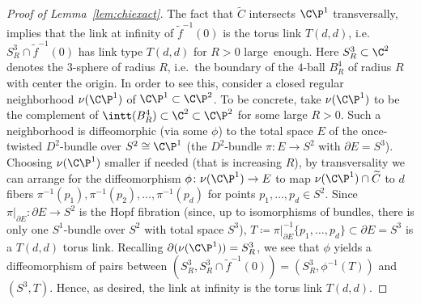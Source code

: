 \begin{proof}[Proof of Lemma~\ref{lem:chiexact}]
The fact that $\widetilde{C}$ intersects $\C\P^1$ transversally, implies that the link at infinity of $\widetilde{f}^{-1}(0)$ is the torus link $T(d,d)$, i.e.~$S^3_R\cap \widetilde{f}^{-1}(0)$ has link type $T(d,d)$ for $R>0$ large~enough. Here $S^3_R\subset \C^2$ denotes the $3$-sphere of radius $R$, i.e.~the boundary of the $4$-ball $B^4_R$ of radius $R$ with center the origin. In order to see this, consider a closed regular neighborhood $\nu(\C\P^1)$ of $\C\P^1\subset\C\P^2$. To be concrete, take $\nu(\C\P^1)$ to be the complement of $\intt(B^4_R)\subset\C^2\subset\C\P^2$ for some large $R>0$. Such a neighborhood is diffeomorphic (via some $\phi$) to the total space $E$ of the once-twisted $D^2$-bundle over $S^2\cong \C\P^1$ (the $D^2$-bundle $\pi\colon E\to S^2$ with $\partial E=S^3$). Choosing $\nu(\C\P^1)$ smaller if needed (that is increasing $R$), by transversality we can arrange for the diffeomorphism $\phi\colon \nu(\C\P^1)\to E$ to map $\nu(\C\P^1)\cap \widetilde{C}$ to $d$ fibers $\pi^{-1}(p_1),\pi^{-1}(p_2),\dots,\pi^{-1}(p_d)$ for points $p_1,\dots,p_d\in S^2$. Since $\pi|_{\partial E}\colon \partial E\to S^2$ is the Hopf fibration (since, up to isomorphisms of bundles, there is only one $S^1$-bundle over $S^2$ with total space $S^3$), $T\coloneqq\pi|_{\partial E}^{-1}\{p_1,\dots,p_d\}\subset \partial E=S^3$ is a $T(d,d)$ torus link. Recalling 
${\partial(\nu(\C\P^1))=S^3_R}$, we see that $\phi$ yields a diffeomorphism of pairs between $(S^3_R,S^3_R\cap \widetilde{f}^{-1}(0))=(S^3_R,\phi^{-1}(T))$ and $(S^3, T)$. Hence, as desired, the link at infinity is the torus link $T(d,d)$.


\end{proof}
